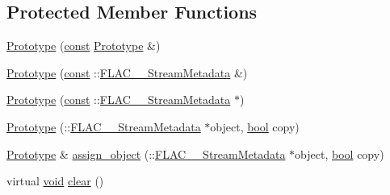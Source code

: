\subsection*{Protected Member Functions}
\begin{DoxyCompactItemize}
\item 
\hyperlink{group__flacpp__metadata__level2_gae49fa399a6273ccad7cb0e6f787a3f5c}{Prototype} (\hyperlink{getopt1_8c_a2c212835823e3c54a8ab6d95c652660e}{const} \hyperlink{class_f_l_a_c_1_1_metadata_1_1_prototype}{Prototype} \&)
\item 
\hyperlink{group__flacpp__metadata__level2_ga3d03bfec2cd09578f166fcd463b56d4f}{Prototype} (\hyperlink{getopt1_8c_a2c212835823e3c54a8ab6d95c652660e}{const} \+::\hyperlink{struct_f_l_a_c_____stream_metadata}{F\+L\+A\+C\+\_\+\+\_\+\+Stream\+Metadata} \&)
\item 
\hyperlink{group__flacpp__metadata__level2_ga1b39c0561f84c3529302dc68b1ba8a2e}{Prototype} (\hyperlink{getopt1_8c_a2c212835823e3c54a8ab6d95c652660e}{const} \+::\hyperlink{struct_f_l_a_c_____stream_metadata}{F\+L\+A\+C\+\_\+\+\_\+\+Stream\+Metadata} $\ast$)
\item 
\hyperlink{class_f_l_a_c_1_1_metadata_1_1_prototype_a23ec8d118119578adb95de42fcbbaca2}{Prototype} (\+::\hyperlink{struct_f_l_a_c_____stream_metadata}{F\+L\+A\+C\+\_\+\+\_\+\+Stream\+Metadata} $\ast$object, \hyperlink{mac_2config_2i386_2lib-src_2libsoxr_2soxr-config_8h_abb452686968e48b67397da5f97445f5b}{bool} copy)
\item 
\hyperlink{class_f_l_a_c_1_1_metadata_1_1_prototype}{Prototype} \& \hyperlink{class_f_l_a_c_1_1_metadata_1_1_prototype_a553ddf0187b31218ecfb0d7ba259fda0}{assign\+\_\+object} (\+::\hyperlink{struct_f_l_a_c_____stream_metadata}{F\+L\+A\+C\+\_\+\+\_\+\+Stream\+Metadata} $\ast$object, \hyperlink{mac_2config_2i386_2lib-src_2libsoxr_2soxr-config_8h_abb452686968e48b67397da5f97445f5b}{bool} copy)
\item 
virtual \hyperlink{sound_8c_ae35f5844602719cf66324f4de2a658b3}{void} \hyperlink{class_f_l_a_c_1_1_metadata_1_1_prototype_a325839301bca33a69890b59416bcb314}{clear} ()
\end{DoxyCompactItemize}
{\bf }\par
